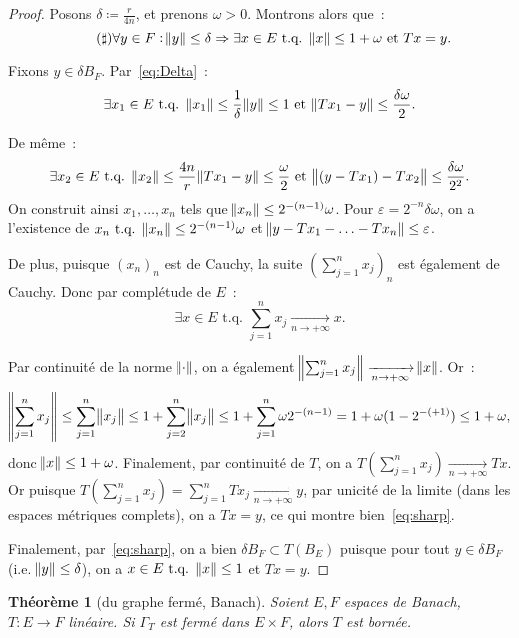 \documentclass{report}
\newcommand{\tq}{\text{ t.q. }}
\newcommand{\st}{\tq}
\newcommand{\pinfty}{{+\infty}}
\newtheorem{thm}{Théorème}[chapter]
\theoremstyle{definition}
\theoremstyle{remark}
\begin{document}
\begin{proof}
Posons $\delta \coloneqq \frac r{4n}$, et prenons $\omega > 0$. Montrons alors que~:
\begin{equation}\tag{$\sharp$}\label{eq:sharp}
	\forall y \in F : \norm y \leq \delta \Rightarrow \exists x \in E \st \norm x \leq 1+\omega \text{ et } Tx = y.
\end{equation}

Fixons $y \in \delta B_F$. Par~\eqref{eq:Delta}~:
\[\exists x_1 \in E \st \norm {x_1} \leq \frac 1\delta\norm y \leq 1 \text{ et } \norm {Tx_1-y} \leq \frac {\delta\omega}2.\]

De même~:
\[\exists x_2 \in E \st \norm {x_2} \leq \frac {4n}r\norm {Tx_1 - y} \leq \frac \omega2 \text{ et } \norm {(y-Tx_1) - Tx_2} \leq \frac {\delta\omega}{2^2}.\]
On construit ainsi $x_1, \ldots, x_n$ tels que $\norm {x_n} \leq 2^{-(n-1)}\omega$. Pour $\varepsilon = 2^{-n}\delta\omega$, on a l'existence de
$x_n \st \norm {x_n} \leq 2^{-(n-1)}\omega$ et $\norm {y-Tx_1-\ldots-Tx_n} \leq \varepsilon$.

De plus, puisque $(x_n)_n$ est de Cauchy, la suite $(\sum_{j=1}^nx_j)_n$ est également de Cauchy. Donc par complétude de $E$~:
\[\exists x \in E \st \sum_{j=1}^nx_j \xrightarrow[n \to \pinfty]{} x.\]

Par continuité de la norme $\norm \cdot$, on a également $\norm {\sum_{j=1}^nx_j} \xrightarrow[n \to \pinfty]{} \norm x$. Or~:
\[\norm {\sum_{j=1}^nx_j} \leq \sum_{j=1}^n\norm {x_j} \leq 1 + \sum_{j=2}^n\norm {x_j} \leq 1 + \sum_{j=1}^n\omega 2^{-(n-1)} = 1 + \omega(1 - 2^{-(+1)}) \leq 1+\omega,\]
donc $\norm x \leq 1+\omega$. Finalement, par continuité de $T$, on a
$T(\sum_{j=1}^nx_j) \xrightarrow[n \to \pinfty]{} Tx$. Or puisque $T(\sum_{j=1}^nx_j) = \sum_{j=1}^nTx_j \xrightarrow[n \to \pinfty]{} y$, par unicité de la limite
(dans les espaces métriques complets), on a $Tx=y$,
ce qui montre bien~\eqref{eq:sharp}.

Finalement, par~\eqref{eq:sharp}, on a bien $\delta B_F \subset T(B_E)$ puisque pour tout $y \in \delta B_F$ (i.e. $\norm y \leq \delta$), on a $x \in E \st \norm x \leq 1$
et $Tx = y$.
\end{proof}

\begin{thm}[du graphe fermé, Banach]\label{thm:graphe fermé} Soient $E, F$ espaces de Banach, $T : E \to F$ linéaire. Si $\Gamma_T$ est fermé dans $E \times F$, alors $T$ est bornée.
\end{thm}
\end{document}
